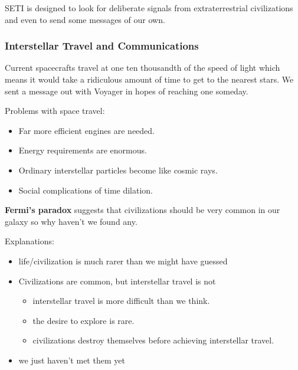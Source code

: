 \documentclass[12pt]{article}
\begin{document}
SETI is designed to look for deliberate signals from extraterrestrial civilizations and even to send some messages of our own.

\subsubsection{Interstellar Travel and Communications}
Current spacecrafts travel at one ten thousandth of the speed of light which means it would take a ridiculous amount of time to get to the nearest stars. We sent a message out with Voyager in hopes of reaching one someday.

Problems with space travel:
\begin{itemize}
    \item Far more efficient engines are needed.
    \item Energy requirements are enormous.
    \item Ordinary interstellar particles become like cosmic rays.
    \item Social complications of time dilation.
\end{itemize}

\textbf{Fermi's paradox} suggests that civilizations should be very common in our galaxy so why haven't we found any.

Explanations:
\begin{itemize}
    \item  life/civilization is much rarer than we might have guessed
    \item Civilizations are common, but interstellar travel is not
    \begin{itemize}
        \item interstellar travel is more difficult than we think.
        \item the desire to explore is rare.
        \item civilizations destroy themselves before achieving interstellar travel.
    \end{itemize}
    \item we just haven't met them yet
\end{itemize}
\end{document}
